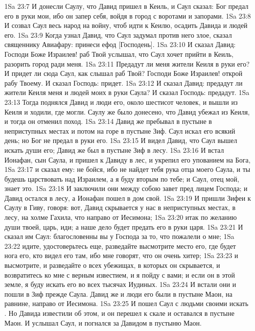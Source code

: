 \vs 1Sa 23:7 И донесли Саулу, что Давид пришел в Кеиль, и Саул сказал: Бог предал его в руки мои, ибо он запер себя, войдя в город с воротами и запорами.
\vs 1Sa 23:8 И созвал Саул весь народ на войну, чтоб идти к Кеилю, осадить Давида и людей его.
\rsbpar\vs 1Sa 23:9 Когда узнал Давид, что Саул задумал против него злое, сказал священнику Авиафару: принеси ефод [Господень].
\vs 1Sa 23:10 И сказал Давид: Господи Боже Израилев! раб Твой услышал, что Саул хочет прийти в Кеиль, разорить город ради меня.
\vs 1Sa 23:11 Предадут ли меня жители Кеиля в руки его? И придет ли сюда Саул, как слышал раб Твой? Господи Боже Израилев! открой рабу Твоему. И сказал Господь: придет.
\vs 1Sa 23:12 И сказал Давид: предадут ли жители Кеиля меня и людей моих в руки Саула? И сказал Господь: предадут.
\vs 1Sa 23:13 Тогда поднялся Давид и люди его, около шестисот человек, и вышли из Кеиля и ходили, где могли. Саулу же было донесено, что Давид убежал из Кеиля, и тогда он отменил поход.
\vs 1Sa 23:14 Давид же пребывал в пустыне в неприступных местах и потом на горе в пустыне Зиф. Саул искал его всякий день; но Бог не предал  в руки его.
\vs 1Sa 23:15 И видел Давид, что Саул вышел искать души его; Давид же был в пустыне Зиф в лесу.
\vs 1Sa 23:16 И встал Ионафан, сын Саула, и пришел к Давиду в лес, и укрепил его упованием на Бога,
\vs 1Sa 23:17 и сказал ему: не бойся, ибо не найдет тебя рука отца моего Саула, и ты будешь царствовать над Израилем, а я буду вторым по тебе; и Саул, отец мой, знает это.
\vs 1Sa 23:18 И заключили они между собою завет пред лицем Господа; и Давид остался в лесу, а Ионафан пошел в дом свой.
\vs 1Sa 23:19 И пришли Зифеи к Саулу в Гиву, говоря: вот, Давид скрывается у нас в неприступных местах, в лесу, на холме Гахила, что направо от Иесимона;
\vs 1Sa 23:20 итак по желанию души твоей, царь, иди; а наше дело будет предать его в руки царя.
\vs 1Sa 23:21 И сказал им Саул: благословенны вы у Господа за то, что пожалели о мне;
\vs 1Sa 23:22 идите, удостоверьтесь еще, разведайте  высмотрите место его, где будет нога его,  кто видел его там, ибо мне говорят, что он очень хитер;
\vs 1Sa 23:23 и высмотрите, и разведайте о всех убежищах, в которых он скрывается, и возвратитесь ко мне с верным известием, и я пойду с вами; и если он в этой земле, я буду искать его во всех тысячах Иудиных.
\vs 1Sa 23:24 И встали они и пошли в Зиф прежде Саула. Давид же и люди его были в пустыне Маон, на равнине, направо от Иесимона.
\vs 1Sa 23:25 И пошел Саул с людьми своими искать . Но Давида известили об этом, и он перешел к скале и оставался в пустыне Маон. И услышал Саул, и погнался за Давидом в пустыню Маон.
